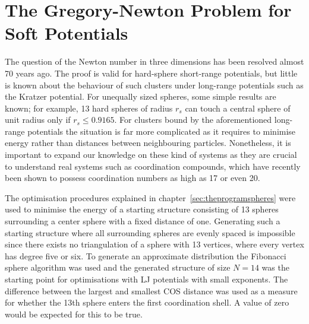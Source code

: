 \section{The Gregory-Newton Problem for Soft Potentials}
\label{sec:thegregorynewtonproblemforsoftpotentials}

The question of the Newton number in three dimensions has been resolved almost
70 years ago\autocite{Schutte_ProblemdreizehnKugeln_1952}. The proof is valid
for hard-sphere short-range potentials, but little is known about the behaviour
of such clusters under long-range potentials such as the Kratzer
potential\autocite{Kratzer_ultrarotenRotationsspektrenHalogenwasserstoffe_1920}.
For unequally sized spheres, some simple results are known; for example, 13 hard
spheres of radius $r_s$ can touch a central sphere of unit radius only if
$r_s\leq 0.9165$.\autocite{phillips12} For clusters bound by the aforementioned
long-range potentials the situation is far more complicated as it requires to
minimise energy rather than distances between neighbouring particles.
Nonetheless, it is important to expand our knowledge on these kind of systems as
they are crucial to understand real systems such as coordination compounds,
which have recently been shown to possess coordination numbers as high as
17\autocite{Kaltsoyannis-2017} or even 20.\autocite{Suresh-2016} 

The optimisation procedures explained in chapter~\ref{sec:theprogramspheres}
were used to minimise the energy of a starting structure consisting of 13
spheres surrounding a center sphere with a fixed distance of one. Generating
such a starting structure where all surrounding spheres are evenly spaced is
impossible since there exists no triangulation of a sphere with 13 vertices,
where every vertex has degree five or
six\autocite{Schwerdtfeger_topologyfullerenes_2015}. To generate an approximate
distribution the Fibonacci sphere
algorithm\autocite{Gonzalez_MeasurementAreasSphere_2010,Keinert_SphericalFibonacciMapping_2015}
was used and the generated structure of size $N=14$ was the starting point for
optimisations with \ac{LJ} potentials with small exponents. The difference
between the largest and smallest \ac{COS} distance was used as a measure for
whether the 13th sphere enters the first coordination shell. A value of zero
would be expected for this to be true.

